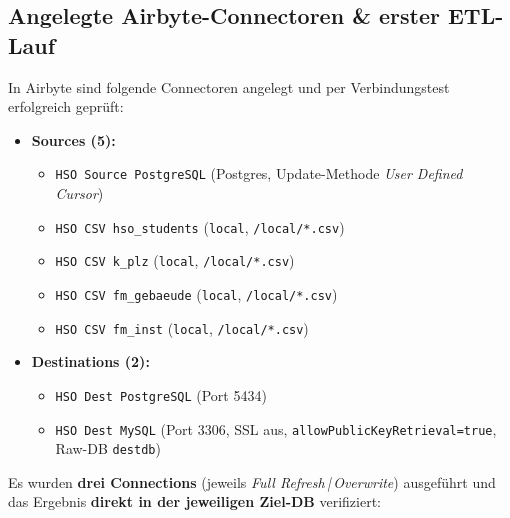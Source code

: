\documentclass[a4paper,12pt]{article}
\begin{document}
\subsection{Angelegte Airbyte-Connectoren \& erster ETL-Lauf}
\label{sec:file-connector}
 
In Airbyte sind folgende Connectoren angelegt und per Verbindungstest erfolgreich geprüft:
 
\begin{itemize}[noitemsep, leftmargin=*]
    \item \textbf{Sources (5):}
    \begin{itemize}[noitemsep, leftmargin=*]
        \item \texttt{HSO Source PostgreSQL}
              (Postgres, Update-Methode \textit{User Defined Cursor})
        \item \texttt{HSO CSV hso\_students} (\texttt{local}, \texttt{/local/*.csv})
        \item \texttt{HSO CSV k\_plz} (\texttt{local}, \texttt{/local/*.csv})
        \item \texttt{HSO CSV fm\_gebaeude} (\texttt{local}, \texttt{/local/*.csv})
        \item \texttt{HSO CSV fm\_inst} (\texttt{local}, \texttt{/local/*.csv})
    \end{itemize}
    \item \textbf{Destinations (2):}
    \begin{itemize}[noitemsep, leftmargin=*]
        \item \texttt{HSO Dest PostgreSQL} (Port 5434)
        \item \texttt{HSO Dest MySQL}
              (Port 3306, SSL aus, \texttt{allowPublicKeyRetrieval=true},
              Raw-DB \texttt{destdb})
    \end{itemize}
\end{itemize}
 
Es wurden \textbf{drei Connections} (jeweils \textit{Full Refresh\,|\,Overwrite})
ausgeführt und das Ergebnis \textbf{direkt in der jeweiligen Ziel-DB} verifiziert:
 
\end{document}
